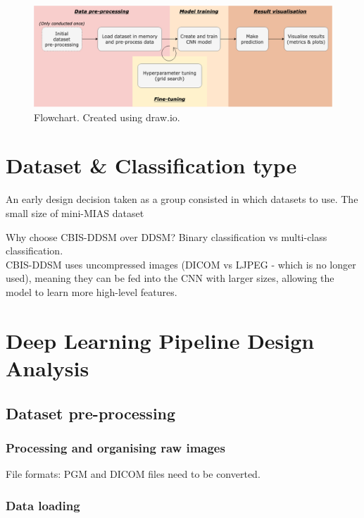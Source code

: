 \begin{figure}[ht]
\centerline{\includegraphics[width=1.1\textwidth]{Dissertation/figures/design/design flowchart.png}}
\caption{\label{fig:design-flowchart}Flowchart. Created using draw.io.}
\end{figure}

\section{Dataset \& Classification type}

An early design decision taken as a group consisted in which datasets to use. The small size of mini-MIAS dataset  

Why choose CBIS-DDSM over DDSM? Binary classification vs multi-class classification.\\

CBIS-DDSM uses uncompressed images (DICOM vs LJPEG - which is no longer used), meaning they can be fed into the CNN with larger sizes, allowing the model to learn more high-level features.

\section{Deep Learning Pipeline Design Analysis}

\subsection{Dataset pre-processing}

\subsubsection{Processing and organising raw images}

File formats: PGM and DICOM files need to be converted.

\subsubsection{Data loading}

